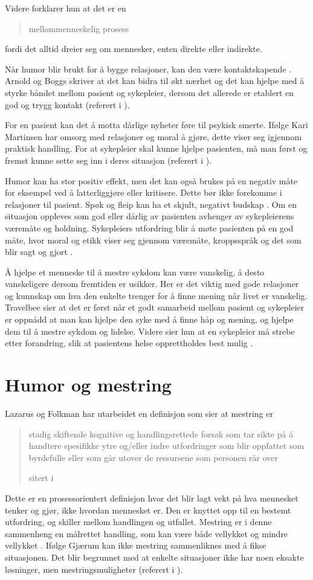 Videre forklarer hun at det er en \blockquote{mellommenneskelig prosess} fordi
det alltid dreier seg om mennesker, enten direkte eller indirekte.

Når humor blir brukt for å bygge relasjoner, kan den være kontaktskapende
\cite[s.~192]{spurkeland2002}. Arnold og Boggs skriver at det kan bidra til økt
nærhet og det kan hjelpe med å styrke båndet mellom pasient og sykepleier,
dersom det allerede er etablert en god og trygg kontakt (referert i
).

For en pasient kan det å motta dårlige nyheter føre til psykisk smerte. Ifølge
Kari Martinsen har omsorg med relasjoner og moral å gjøre, dette viser seg
igjennom praktisk handling. For at sykepleier skal kunne hjelpe pasienten, må
man  først og fremst kunne sette seg inn i deres situasjon (referert i
).

Humor kan ha stor positiv effekt, men det kan også brukes på en negativ måte
for eksempel ved å latterliggjøre eller kritisere. Dette bør ikke forekomme i
relasjoner til pasient. Spøk og fleip kan ha et skjult, negativt budskap
\cite[s.~246]{eide2008}. Om en situasjon oppleves som god eller dårlig av
pasienten avhenger av sykepleierens væremåte og holdning.  Sykepleiers
utfordring blir å møte pasienten på en god måte, hvor moral og etikk viser seg
gjennom væremåte, kroppsspråk og det som blir sagt og gjort
\cite[s.~127]{brinchmann2008}.

Å hjelpe et menneske til å mestre sykdom kan være vanskelig, å desto
vanskeligere dersom fremtiden er usikker. Her er det viktig med gode relasjoner
og kunnskap om hva den enkelte trenger for å finne mening når livet er
vanskelig. Travelbee sier at det er først når et godt samarbeid mellom pasient
og sykepleier er oppnådd at man kan hjelpe den syke med å finne håp og mening,
og hjelpe dem til å mestre sykdom og lidelse. Videre sier hun at en sykepleier
må strebe etter forandring, slik at pasientens helse opprettholdes best mulig
\cite[s.~30]{travelbee2001}.

\section{Humor og mestring}

Lazarus og Folkman har utarbeidet en definisjon som sier at mestring er
\blockquote[{sitert i }]{stadig skiftende kognitive og
handlingsrettede forsøk som tar sikte på å handtere spesifikke ytre og/eller
indre utfordringer som blir oppfattet som byrdefulle eller som går utover de
ressursene som personen rår over}. Dette er en prosessorientert definisjon hvor
det blir lagt vekt på hva mennesket tenker og gjør, ikke hvordan mennesket er.
Den er knyttet opp til en bestemt utfordring, og skiller mellom handlingen og
utfallet. Mestring er i denne sammenheng en målrettet handling, som kan være
både vellykket og mindre vellykket \cite[s.~65]{heggen2010}. Ifølge Gjærum kan
ikke mestring sammenliknes med å fikse situasjonen. Det blir begrunnet med at
enkelte situasjoner ikke har noen eksakte løsninger, men mestringsmuligheter
(referert i ).

